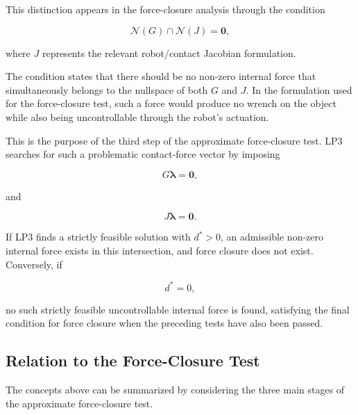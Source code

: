 This distinction appears in the force-closure analysis through the condition

\begin{equation}
\mathcal{N}(G)\cap\mathcal{N}(J)={\mathbf{0}},
\end{equation}

where $J$ represents the relevant robot/contact Jacobian formulation.

The condition states that there should be no non-zero internal force that simultaneously belongs to the nullspace of both $G$ and $J$. In the formulation used for the force-closure test, such a force would produce no wrench on the object while also being uncontrollable through the robot's actuation.

This is the purpose of the third step of the approximate force-closure test. LP3 searches for such a problematic contact-force vector by imposing

\begin{equation}
G\boldsymbol{\lambda}=\mathbf{0},
\end{equation}

and

\begin{equation}
J\boldsymbol{\lambda}=\mathbf{0}.
\end{equation}

If LP3 finds a strictly feasible solution with $d^*>0$, an admissible non-zero internal force exists in this intersection, and force closure does not exist. Conversely, if

\begin{equation}
d^*=0,
\end{equation}

no such strictly feasible uncontrollable internal force is found, satisfying the final condition for force closure when the preceding tests have also been passed.

\subsection{Relation to the Force-Closure Test}

The concepts above can be summarized by considering the three main stages of the approximate force-closure test.

